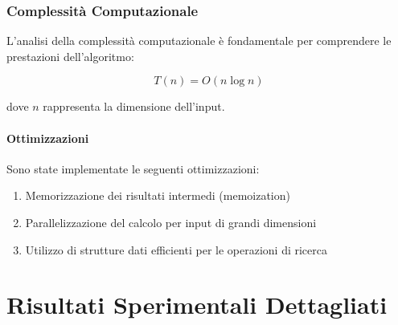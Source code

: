 \subsubsection{Complessità Computazionale}

L'analisi della complessità computazionale è fondamentale per comprendere le prestazioni dell'algoritmo:

\begin{equation}
    T(n) = O(n \log n)
\end{equation}

dove $n$ rappresenta la dimensione dell'input.

\paragraph{Ottimizzazioni}

Sono state implementate le seguenti ottimizzazioni:

\begin{enumerate}
    \item Memorizzazione dei risultati intermedi (memoization)
    \item Parallelizzazione del calcolo per input di grandi dimensioni
    \item Utilizzo di strutture dati efficienti per le operazioni di ricerca
\end{enumerate}

\section{Risultati Sperimentali Dettagliati}

